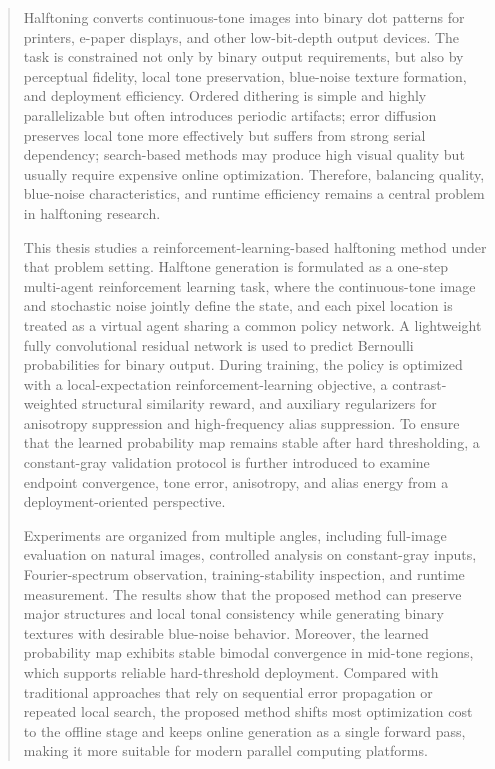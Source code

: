 \documentclass[thesis]{../zstucs-graduation-project}
\begin{document}
\clearpage
\renewcommand{\abstractname}{Abstract}
\begin{abstract}
Halftoning converts continuous-tone images into binary dot patterns for printers, e-paper displays, and other low-bit-depth output devices. The task is constrained not only by binary output requirements, but also by perceptual fidelity, local tone preservation, blue-noise texture formation, and deployment efficiency. Ordered dithering is simple and highly parallelizable but often introduces periodic artifacts; error diffusion preserves local tone more effectively but suffers from strong serial dependency; search-based methods may produce high visual quality but usually require expensive online optimization. Therefore, balancing quality, blue-noise characteristics, and runtime efficiency remains a central problem in halftoning research.

This thesis studies a reinforcement-learning-based halftoning method under that problem setting. Halftone generation is formulated as a one-step multi-agent reinforcement learning task, where the continuous-tone image and stochastic noise jointly define the state, and each pixel location is treated as a virtual agent sharing a common policy network. A lightweight fully convolutional residual network is used to predict Bernoulli probabilities for binary output. During training, the policy is optimized with a local-expectation reinforcement-learning objective, a contrast-weighted structural similarity reward, and auxiliary regularizers for anisotropy suppression and high-frequency alias suppression. To ensure that the learned probability map remains stable after hard thresholding, a constant-gray validation protocol is further introduced to examine endpoint convergence, tone error, anisotropy, and alias energy from a deployment-oriented perspective.

Experiments are organized from multiple angles, including full-image evaluation on natural images, controlled analysis on constant-gray inputs, Fourier-spectrum observation, training-stability inspection, and runtime measurement. The results show that the proposed method can preserve major structures and local tonal consistency while generating binary textures with desirable blue-noise behavior. Moreover, the learned probability map exhibits stable bimodal convergence in mid-tone regions, which supports reliable hard-threshold deployment. Compared with traditional approaches that rely on sequential error propagation or repeated local search, the proposed method shifts most optimization cost to the offline stage and keeps online generation as a single forward pass, making it more suitable for modern parallel computing platforms.


\end{abstract}
\end{document}
